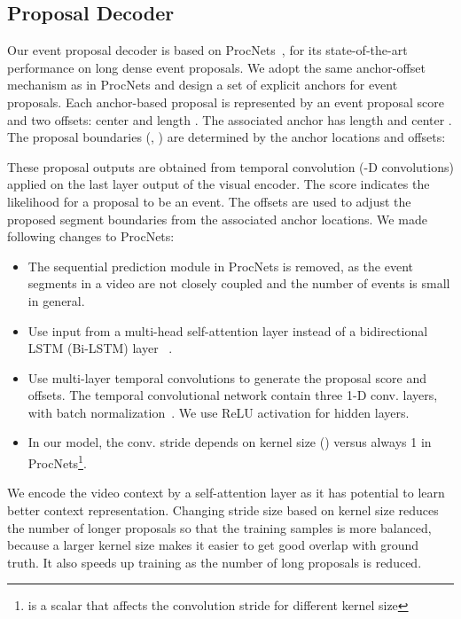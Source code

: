 \documentclass[10pt,twocolumn,letterpaper]{article}
\begin{document}
\subsection{Proposal Decoder}
\label{sec:proposal}
Our event proposal decoder is based on ProcNets~\cite{zhou2017procnets}, for its state-of-the-art performance on long dense event proposals. 
We adopt the same anchor-offset mechanism as in ProcNets and design a set of  explicit anchors for event proposals. Each anchor-based proposal is represented by an event proposal score  and two offsets:  center  and length . The associated anchor has length  and center . The proposal boundaries (, ) are determined by the anchor locations and offsets:

These proposal outputs are obtained from temporal convolution (-D convolutions) applied on the last layer output of the visual encoder. 
The score indicates the likelihood for a proposal to be an event. The offsets are used to adjust the proposed segment boundaries from the associated anchor locations. We made following changes to ProcNets:

\begin{itemize}
\topsep=0em
\itemsep=0em
\parskip=0em
\parsep=0em
\item The sequential prediction module in ProcNets is removed, as the event segments in a video are not closely coupled and the number of events is small in general.
\item Use input from a multi-head self-attention layer instead of a bidirectional LSTM (Bi-LSTM) layer ~\cite{graves2005framewise}. 
\item Use multi-layer temporal convolutions to generate the proposal score and offsets. The temporal convolutional network contain three 1-D conv. layers, with batch normalization~\cite{ioffe2015batch}. We use ReLU activation for hidden layers.
\item In our model, the conv. stride depends on kernel size () versus always 1 in ProcNets\footnote{ is a scalar that affects the convolution stride for different kernel size}.
\end{itemize}

We encode the video context by a self-attention layer as it has potential to learn better context representation. Changing stride size based on kernel size reduces the number of longer proposals so that the training samples is more balanced, because a larger kernel size makes it easier to get good overlap with ground truth. It also speeds up training as the number of long proposals is reduced.
\end{document}
